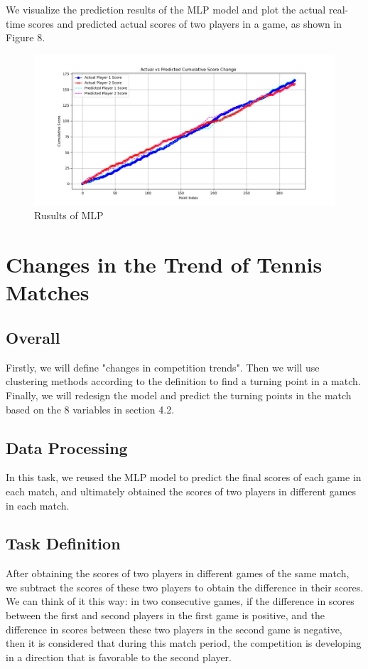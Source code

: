 \documentclass{mcmthesis}
\begin{document}
We visualize the prediction results of the MLP model and plot the actual real-time scores and predicted actual scores of two players in a game, as shown in Figure 8.

\begin{figure}[h]
\centering
\includegraphics[width=12cm]{figures/replace.JPG}
\caption{Rusults of MLP} \label{fig:aa}
\end{figure}


\section{Changes in the Trend of Tennis Matches}
\subsection{Overall}
Firstly, we will define "changes in competition trends". Then we will use clustering methods according to the definition to find a turning point in a match. Finally, we will redesign the model and predict the turning points in the match based on the 8 variables in section 4.2.

\subsection{Data Processing}
In this task, we reused the MLP model to predict the final scores of each game in each match, and ultimately obtained the scores of two players in different games in each match.

\subsection{Task Definition}
After obtaining the scores of two players in different games of the same match, we subtract the scores of these two players to obtain the difference in their scores. We can think of it this way: in two consecutive games, if the difference in scores between the first and second players in the first game is positive, and the difference in scores between these two players in the second game is negative, then it is considered that during this match period, the competition is developing in a direction that is favorable to the second player. 
\end{document}
